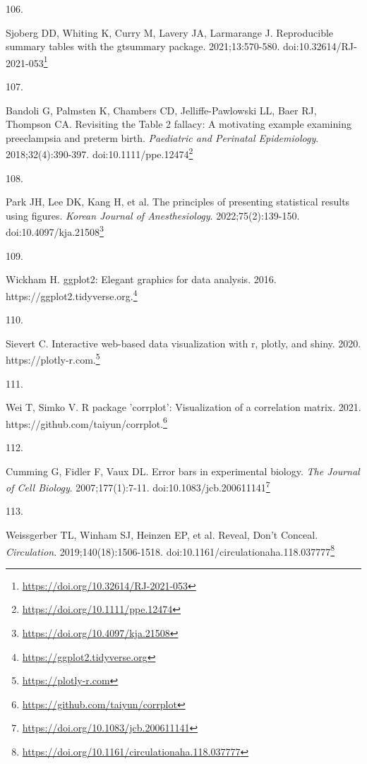 \documentclass[
  a4paper,
]{book}
\newlength{\cslhangindent}
\newlength{\csllabelwidth}
\newlength{\cslentryspacingunit} %
\newenvironment{CSLReferences}[2] %
 {%
  \setlength{\parindent}{0pt}
  \ifodd #1
  \let\oldpar\par
  \def\par{\hangindent=\cslhangindent\oldpar}
  \fi
  \setlength{\parskip}{#2\cslentryspacingunit}
 }%
 {}
\newcommand{\CSLLeftMargin}[1]{\parbox[t]{\csllabelwidth}{#1}}
\newcommand{\CSLRightInline}[1]{\parbox[t]{\linewidth - \csllabelwidth}{#1}\break}
\renewcommand{\href}[2]{#2\footnote{\url{#1}}}
\begin{document}
\begin{CSLReferences}{0}{0}
\leavevmode{}%
\CSLLeftMargin{106. }%
\CSLRightInline{Sjoberg DD, Whiting K, Curry M, Lavery JA, Larmarange J. Reproducible summary tables with the gtsummary package. 2021;13:570-580. doi:\href{https://doi.org/10.32614/RJ-2021-053}{10.32614/RJ-2021-053}}

\leavevmode{}%
\CSLLeftMargin{107. }%
\CSLRightInline{Bandoli G, Palmsten K, Chambers CD, Jelliffe-Pawlowski LL, Baer RJ, Thompson CA. Revisiting the Table 2 fallacy: A motivating example examining preeclampsia and preterm birth. \emph{Paediatric and Perinatal Epidemiology}. 2018;32(4):390-397. doi:\href{https://doi.org/10.1111/ppe.12474}{10.1111/ppe.12474}}

\leavevmode{}%
\CSLLeftMargin{108. }%
\CSLRightInline{Park JH, Lee DK, Kang H, et al. The principles of presenting statistical results using figures. \emph{Korean Journal of Anesthesiology}. 2022;75(2):139-150. doi:\href{https://doi.org/10.4097/kja.21508}{10.4097/kja.21508}}

\leavevmode{}%
\CSLLeftMargin{109. }%
\CSLRightInline{Wickham H. ggplot2: Elegant graphics for data analysis. 2016. \href{https://ggplot2.tidyverse.org}{https://ggplot2.tidyverse.org.}}

\leavevmode{}%
\CSLLeftMargin{110. }%
\CSLRightInline{Sievert C. Interactive web-based data visualization with r, plotly, and shiny. 2020. \href{https://plotly-r.com}{https://plotly-r.com.}}

\leavevmode{}%
\CSLLeftMargin{111. }%
\CSLRightInline{Wei T, Simko V. R package 'corrplot': Visualization of a correlation matrix. 2021. \href{https://github.com/taiyun/corrplot}{https://github.com/taiyun/corrplot.}}

\leavevmode{}%
\CSLLeftMargin{112. }%
\CSLRightInline{Cumming G, Fidler F, Vaux DL. Error bars in experimental biology. \emph{The Journal of Cell Biology}. 2007;177(1):7-11. doi:\href{https://doi.org/10.1083/jcb.200611141}{10.1083/jcb.200611141}}

\leavevmode{}%
\CSLLeftMargin{113. }%
\CSLRightInline{Weissgerber TL, Winham SJ, Heinzen EP, et al. Reveal, Don{'}t Conceal. \emph{Circulation}. 2019;140(18):1506-1518. doi:\href{https://doi.org/10.1161/circulationaha.118.037777}{10.1161/circulationaha.118.037777}}


\end{CSLReferences}
\end{document}
